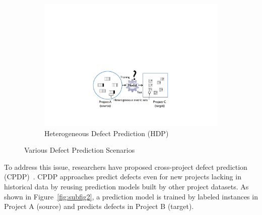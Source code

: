 \begin{figure}[t]
 \begin{subfigure}{0.8\linewidth}
 	\includegraphics[scale=0.5]{Figures/intro/p_crossdomain.pdf}
  	\caption{Heterogeneous Defect Prediction \tiny{(HDP)}}
   	\label{fig:subfig3}
 \end{subfigure}
 
 \label{fig:type_of_predictions}
 \caption{%
  Various Defect Prediction Scenarios
  }
\end{figure}


To address this issue, researchers
have proposed cross-project defect
prediction (CPDP)~\cite{He12, Ma12, Nam13, Rahman12, Turhan09, Zimmermann09}.
CPDP approaches predict defects even for new projects lacking
in historical data by reusing prediction models built by other project
datasets. As shown in Figure~\ref{fig:subfig2}, a prediction model is trained by
labeled instances in Project A (source) and predicts defects in Project B (target).

% 

